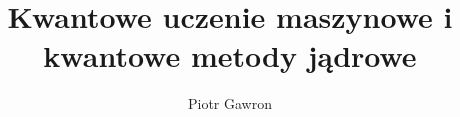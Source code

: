 \documentclass[10pt, xcolor={dvipsnames,svgnames}, aspectratio=169]{beamer}
\begin{document}
\title{Kwantowe uczenie maszynowe i kwantowe metody jądrowe}
\author{Piotr Gawron}
\date{}
\frame{\maketitle}




\end{document}
